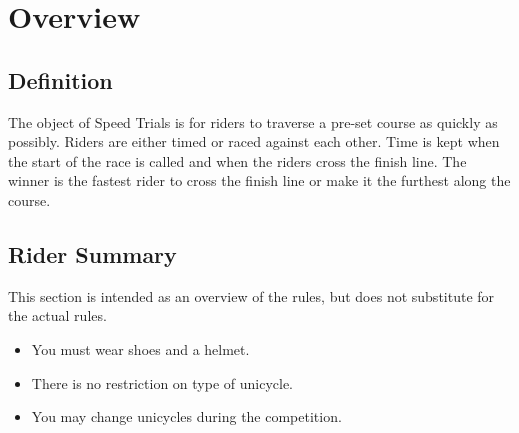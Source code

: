 \chapter{Overview}

\section{Definition}

The object of Speed Trials is for riders to traverse a pre-set course as quickly as possibly.
Riders are either timed or raced against each other.
Time is kept when the start of the race is called and when the riders cross the finish line.
The winner is the fastest rider to cross the finish line or make it the furthest along the course.

\section{Rider Summary}

This section is intended as an overview of the rules, but does not substitute for the actual rules.
\begin{itemize}
\item You must wear shoes and a helmet.
\item There is no restriction on type of unicycle.
\item You may change unicycles during the competition.
\end{itemize}
